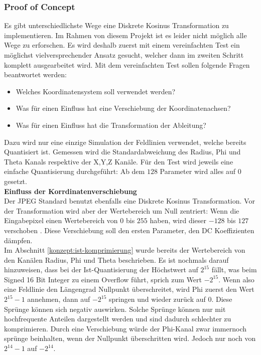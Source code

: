 \subsubsection{Proof of Concept}
Es gibt unterschiedlichste Wege eine Diskrete Kosinus Transformation zu implementieren. Im Rahmen von diesem Projekt ist es leider nicht möglich alle Wege zu erforschen. Es wird deshalb zuerst mit einem vereinfachten Test ein möglichst vielversprechender Ansatz gesucht, welcher dann im zweiten Schritt komplett ausgearbeitet wird. Mit dem vereinfachten Test sollen folgende Fragen beantwortet werden:
\begin{itemize}
	\item Welches Koordinatensystem soll verwendet werden?
	\item Was für einen Einfluss hat eine Verschiebung der Koordinatenachsen?
	\item Was für einen Einfluss hat die Transformation der Ableitung?
\end{itemize}
Dazu wird nur eine einzige Simulation der Feldlinien verwendet, welche bereits Quantisiert ist. Gemessen wird die Standardabweichung des Radius, Phi und Theta Kanals respektive der X,Y,Z Kanäle. Für den Test wird jeweils eine einfache Quantisierung durchgeführt: Ab dem $128$ Parameter wird alles auf $0$ gesetzt.\\
[\baselineskip]
\textbf{Einfluss der Korrdinatenverschiebung}\\
Der JPEG Standard  benutzt ebenfalls eine Diskrete Kosinus Transformation. Vor der Transformation wird aber der Wertebereich um Null zentriert: Wenn die Eingabepixel einen Wertebereich von  $0$ bis $255$ haben, wird dieser $-128$ bis $127$ verschoben \cite{wiki:dct:jpeg}. Diese Verschiebung soll den ersten Parameter, den DC Koeffizienten \cite{wiki:dc_bias} dämpfen.\\
[\baselineskip]
Im Abschnitt \ref{konzept:ist-komprimierung} wurde bereits der Wertebereich von den Kanälen Radius, Phi und Theta beschrieben. Es ist nochmals darauf hinzuweisen, dass bei der Ist-Quantisierung der Höchstwert auf $2^{15}$ fällt, was beim Signed 16 Bit Integer zu einem Overflow führt, sprich zum Wert $-2^{15}$. Wenn also eine Feldlinie den Längengrad Nullpunkt überschreitet, wird Phi zuerst den Wert $2^{15}-1$ annehmen, dann auf $-2^{15}$ springen und wieder zurück auf 0. Diese Sprünge können sich negativ auswirken. Solche Sprünge können nur mit hochfrequente Anteilen dargestellt werden und sind dadurch schlechter zu komprimieren. Durch eine Verschiebung würde der Phi-Kanal zwar immernoch sprünge beinhalten, wenn der Nullpunkt überschritten wird. Jedoch nur noch von $2^{14}-1$ auf $-2^{14}$.
